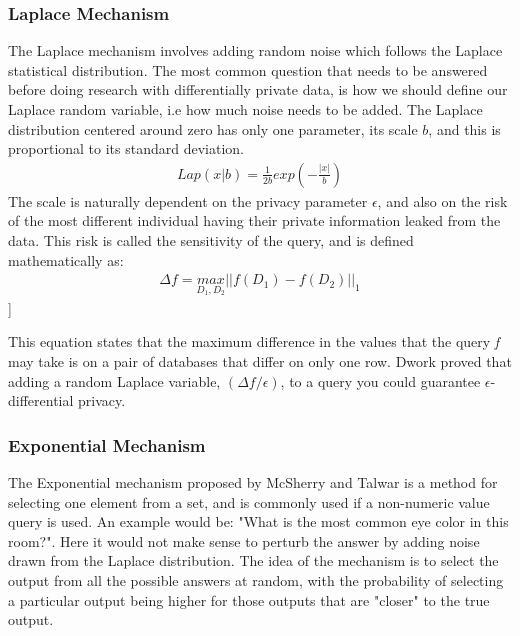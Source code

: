 \subsubsection{Laplace Mechanism}
The Laplace mechanism involves adding random noise which follows the Laplace statistical distribution. The most common question that needs to be answered before doing research with differentially private data, is how we should define our Laplace random variable, i.e how much noise needs to be added. The Laplace distribution centered around zero has only one parameter, its scale $b$, and this is proportional to its standard deviation. 
\begin{eqnarray} \label{LaplaceDisDef}
Lap(x|b) = \frac{1}{2b} exp (−\frac{|x|}{b})
\end{eqnarray}
The scale is naturally dependent on the privacy parameter $\epsilon$, and also on the risk of the most different individual having their private information leaked from the data. This risk is called the sensitivity of the query, and is defined mathematically as:
\begin{eqnarray} \label{LaplaceMecDef}
\Delta \mathit{f}=\underset{D_1,D_2}{max}||\mathit{f(D_1)}-\mathit{f(D_2)}||_{1}
 \end{eqnarray}
  ]

This equation states that the maximum difference in the values that the query \textit{f} may take is on a pair of databases that differ on only one row. Dwork proved that adding a random Laplace variable, $(\Delta f/\epsilon)$, to a query you could guarantee $\epsilon$-differential privacy\cite{dwork2013algorithmic}. 

\subsubsection{Exponential Mechanism}
The Exponential mechanism proposed by McSherry and Talwar \cite{mcsherry2007} is a method for selecting one element from a set, and is commonly used if a non-numeric value query is used. An example would be: "What is the most common eye color in this room?". Here it would not make sense to perturb the answer by adding noise drawn from the Laplace distribution. The idea of the mechanism is to select the output from all the possible answers at random, with the probability of selecting a particular output being higher for those outputs that are "closer" to the true output. 

